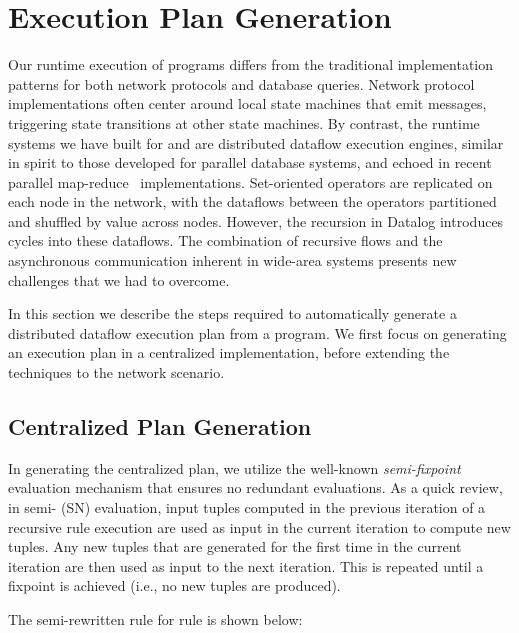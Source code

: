 \section{Execution Plan Generation}
\label{sec:queryPro}

Our runtime execution of \Dlog programs differs from the traditional
implementation patterns for both network protocols and database
queries.  Network protocol implementations often center around local
state machines that emit messages, triggering state transitions at
other state machines.  By contrast, the runtime systems we have built
for \Dlog and \Overlog are distributed dataflow execution engines,
similar in spirit to those developed for parallel database systems,
and echoed in recent parallel map-reduce~\cite{mapreduce} implementations.
Set-oriented operators are replicated on each node in the network,
with the dataflows between the operators partitioned and shuffled by
value across nodes. However, the recursion in  Datalog introduces
cycles into these dataflows. The combination of recursive flows and
the asynchronous communication inherent in wide-area systems presents
new challenges that we had to overcome.

In this section we describe the steps required to automatically generate a distributed dataflow execution
plan from a \Dlog program. We first focus on generating an execution
plan in a centralized implementation, before extending the techniques
to the network scenario.

\subsection{Centralized Plan Generation}
\label{sec:semiNaive}

In generating the centralized plan, we utilize the well-known {\em
semi-\naive fixpoint}~\cite{semi,semi1} evaluation mechanism that
ensures no redundant evaluations. As a quick review, in semi-\naive
(SN) evaluation, input tuples computed in the previous iteration of a
recursive rule execution are used as input in the current iteration to
compute new tuples. Any new tuples that are generated for the first
time in the current iteration are then used as input to the next
iteration. This is repeated until a fixpoint is achieved (i.e., no new
tuples are produced).

The semi-\naive rewritten rule for rule  is shown below:

